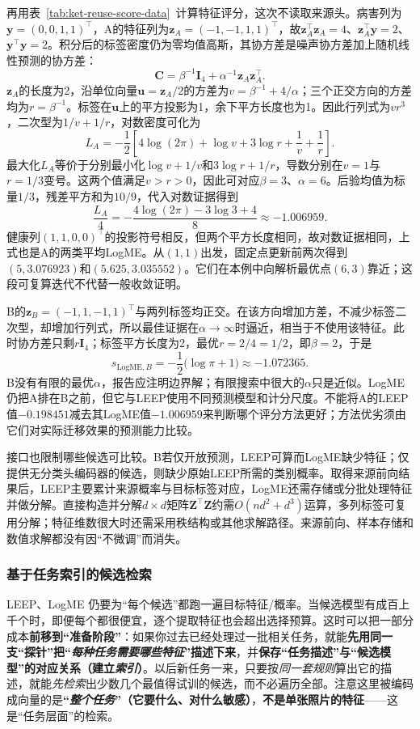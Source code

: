 再用表~\ref{tab:ket-reuse-score-data}~计算特征评分，这次不读取来源头。病害列为$\bm y=(0,0,1,1)^\top$，A的特征列为$\bm z_A=(-1,-1,1,1)^\top$，故$\bm z_A^\top\bm z_A=4$、$\bm z_A^\top\bm y=2$、$\bm y^\top\bm y=2$。积分后的标签密度仍为零均值高斯，其协方差是噪声协方差加上随机线性预测的协方差：
\[
  \bm C=\beta^{-1}\bm I_4+\alpha^{-1}\bm z_A\bm z_A^\top.
\]
$\bm z_A$的长度为2，沿单位向量$\bm u=\bm z_A/2$的方差为$v=\beta^{-1}+4/\alpha$；三个正交方向的方差均为$r=\beta^{-1}$。标签在$\bm u$上的平方投影为1，余下平方长度也为1。因此行列式为$vr^3$，二次型为$1/v+1/r$，对数密度可化为
\[
  L_A=-\frac12\left[
  4\log(2\pi)+\log v+3\log r+\frac1v+\frac1r\right].
\]
最大化$L_A$等价于分别最小化$\log v+1/v$和$3\log r+1/r$，导数分别在$v=1$与$r=1/3$变号。这两个值满足$v>r>0$，因此可对应$\beta=3$、$\alpha=6$。后验均值为标量$1/3$，残差平方和为$10/9$，代入对数证据得到
\[
  \frac{L_A}{4}
  =-\frac{4\log(2\pi)-3\log3+4}{8}
  \approx-1.006959.
\]
健康列$(1,1,0,0)^\top$的投影符号相反，但两个平方长度相同，故对数证据相同，上式也是A的两类平均LogME。从$(1,1)$出发，固定点更新前两次得到$(5,3.076923)$和$(5.625,3.035552)$。它们在本例中向解析最优点$(6,3)$靠近；这段可复算迭代不代替一般收敛证明。

B的$\bm z_B=(-1,1,-1,1)^\top$与两列标签均正交。在该方向增加方差，不减少标签二次型，却增加行列式，所以最佳证据在$\alpha\to\infty$时逼近，相当于不使用该特征。此时协方差只剩$r\bm I_4$；标签平方长度为2，最优$r=2/4=1/2$，即$\beta=2$，于是
\[
  s_{\mathrm{LogME},B}
  =-\frac12\bigl(\log\pi+1\bigr)
  \approx-1.072365.
\]
B没有有限的最优$\alpha$，报告应注明边界解；有限搜索中很大的$\alpha$只是近似。LogME仍把A排在B之前，但它与LEEP使用不同预测模型和计分尺度。不能将A的LEEP值$-0.198451$减去其LogME值$-1.006959$来判断哪个评分方法更好；方法优劣须由它们对实际迁移效果的预测能力比较。

接口也限制哪些候选可比较。B若仅开放预测，LEEP可算而LogME缺少特征；仅提供无分类头编码器的候选，则缺少原始LEEP所需的类别概率。取得来源前向结果后，LEEP主要累计来源概率与目标标签对应，LogME还需存储或分批处理特征并做分解。直接构造并分解$d\times d$矩阵$\bm Z^\top\bm Z$约需$O(nd^2+d^3)$运算，多列标签可复用分解；特征维数很大时还需采用秩结构或其他求解路径。来源前向、样本存储和数值求解都没有因“不微调”而消失。

\subsubsection{基于任务索引的候选检索}
\label{sec:ket-reuse-task-embedding}

LEEP、LogME 仍要为“每个候选”都跑一遍目标特征/概率。当候选模型有成百上千个时，即便每个都很便宜，逐个提取特征也会超出选择预算。这时可以把一部分成本\textbf{前移到“准备阶段”}：如果你过去已经处理过一批相关任务，就能\textbf{先用同一支“探针”把“\emph{每种任务需要哪些特征}”描述下来}，并\textbf{保存“任务描述”与“候选模型”的对应关系（建立\emph{索引}）}。以后新任务一来，只要按\emph{同一套规则}算出它的描述，就能\emph{先检索}出少数几个最值得试训的候选，而不必遍历全部。注意这里被编码成向量的是\textbf{“\emph{整个任务}”（它要什么、对什么敏感）}，\textbf{不是单张照片的特征}——这是“任务层面”的检索。

